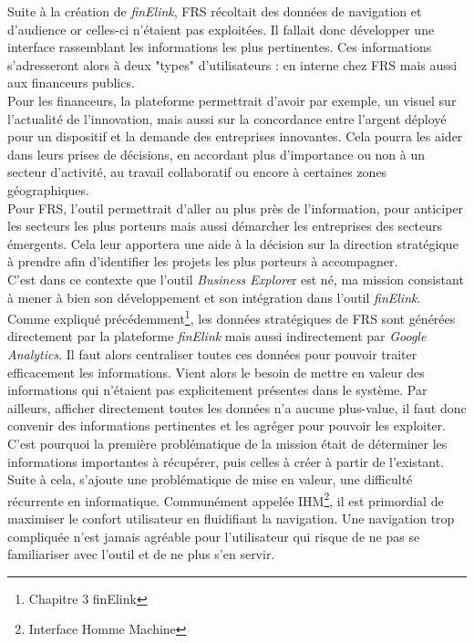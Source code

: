 Suite à la création de \textit{finElink}, FRS récoltait des données de navigation et d'audience or celles-ci n'étaient pas exploitées. Il fallait donc développer une interface rassemblant les informations les plus pertinentes. Ces informations s'adresseront alors à deux "types" d'utilisateurs : en interne chez FRS mais aussi aux financeurs publics.\\

Pour les financeurs, la plateforme permettrait d'avoir par exemple, un visuel sur l'actualité de l'innovation, mais aussi sur la concordance entre l'argent déployé pour un dispositif et la demande des entreprises innovantes. Cela pourra les aider dans leurs prises de décisions, en accordant plus d'importance ou non à un secteur d'activité, au travail collaboratif ou encore à certaines zones géographiques.\\

Pour FRS, l'outil permettrait d'aller au plus près de l'information, pour anticiper les secteurs les plus porteurs mais aussi démarcher les entreprises des secteurs émergents. Cela leur apportera une aide à la décision sur la direction stratégique à prendre afin d'identifier les projets les plus porteurs à accompagner.\\

C'est dans ce contexte que l'outil \textit{Business Explore}r est né, ma mission consistant à mener à bien son développement et son intégration dans l'outil \textit{finElink}.\\

Comme expliqué précédemment\footnote{Chapitre 3 finElink}, les données stratégiques de FRS sont générées directement par la plateforme \textit{finElink} mais aussi indirectement par \textit{Google Analytics}. Il faut alors centraliser toutes ces données pour pouvoir traiter efficacement les informations. Vient alors le besoin de mettre en valeur des informations qui n'étaient pas explicitement présentes dans le système. Par ailleurs, afficher directement toutes les données n'a aucune plus-value, il faut donc convenir des informations pertinentes et les agréger pour pouvoir les exploiter.\\

C'est pourquoi la première problématique de la mission était de déterminer les informations importantes à récupérer, puis celles à créer à partir de l'existant.\\

Suite à cela, s'ajoute une problématique de mise en valeur, une difficulté récurrente en informatique. Communément appelée IHM\footnote{Interface Homme Machine}, il est primordial de maximiser le confort utilisateur en fluidifiant la navigation. Une navigation trop compliquée n'est jamais agréable pour l'utilisateur qui risque de ne pas se familiariser avec l'outil et de ne plus s'en servir.